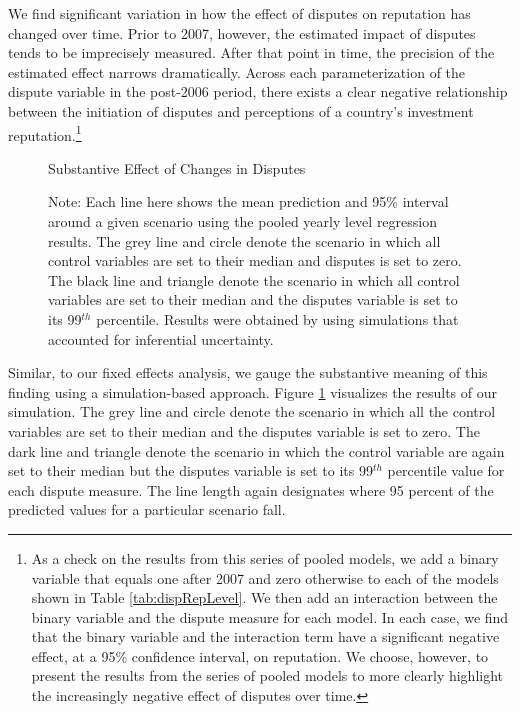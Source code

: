 \documentclass[12pt,onesided]{amsart}
\begin{document}
We find significant variation in how the effect of disputes on reputation has changed over time. Prior to 2007, however, the estimated impact of disputes tends to be imprecisely measured. After that point in time, the precision of the estimated effect narrows dramatically. Across each parameterization of the dispute variable in the post-2006 period, there exists a clear negative relationship between the initiation of disputes and perceptions of a country's investment reputation.\footnote{As a check on the results from this series of pooled models, we add a binary variable that equals one after 2007 and zero otherwise to each of the models shown in Table \ref{tab:dispRepLevel}. We then add an interaction between the binary variable and the dispute measure for each model. In each case, we find that the binary variable and the interaction term have a significant negative effect, at a 95\% confidence interval, on reputation. We choose, however, to present the results from the series of pooled models to more clearly highlight the increasingly negative effect of disputes over time.} 

\begin{figure}[ht]
	\centering
	\caption{Substantive Effect of Changes in Disputes}
	\label{fig:dispEffectYearSim}
	\resizebox{1\textwidth}{!}{}
	\caption*{Note: Each line here shows the mean prediction and 95\% interval around a given scenario using the pooled yearly level regression results. The grey line and circle denote the scenario in which all control variables are set to their median and disputes is set to zero. The black line and triangle denote the scenario in which all control variables are set to their median and the disputes variable is set to its 99$^{th}$ percentile. Results were obtained by using simulations that accounted for inferential uncertainty. }
\end{figure}
\FloatBarrier

Similar, to our fixed effects analysis, we gauge the substantive meaning of this finding using a simulation-based approach. Figure \ref{fig:dispEffectYearSim} visualizes the results of our simulation. The grey line and circle denote the scenario in which all the control variables are set to their median and the disputes variable is set to zero. The dark line and triangle denote the scenario in which the control variable are again set to their median but the disputes variable is set to its 99$^{th}$ percentile value for each dispute measure. The line length again designates where 95 percent of the predicted values for a particular scenario fall. 
\end{document}
